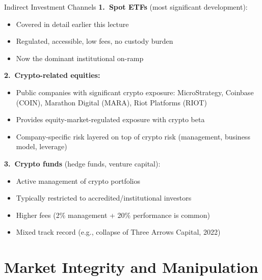 \documentclass[10pt]{beamer}
\newcommand{\bad}[1]{\textcolor{AccentOrange}{#1}}
\begin{document}
\begin{frame}{Indirect Investment Channels}
  \textbf{1.\ Spot ETFs} (most significant development):
  \begin{itemize}
    \item Covered in detail earlier this lecture
    \item Regulated, accessible, low fees, no custody burden
    \item Now the dominant institutional on-ramp
  \end{itemize}
  
  \vspace{0.3em}
  \textbf{2.\ Crypto-related equities:}
  \begin{itemize}
    \item Public companies with significant crypto exposure: MicroStrategy, Coinbase (COIN), Marathon Digital (MARA), Riot Platforms (RIOT)
    \item Provides equity-market-regulated exposure with crypto beta
    \item \bad{Company-specific risk} layered on top of crypto risk (management, business model, leverage)
  \end{itemize}
  
  \vspace{0.3em}
  \textbf{3.\ Crypto funds} (hedge funds, venture capital):
  \begin{itemize}
    \item Active management of crypto portfolios
    \item Typically restricted to accredited/institutional investors
    \item Higher fees (2\% management + 20\% performance is common)
    \item Mixed track record (e.g., collapse of Three Arrows Capital, 2022)
  \end{itemize}
\end{frame}

\section{Market Integrity and Manipulation}
\end{document}
